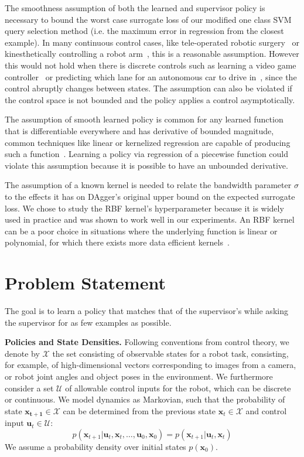 \documentclass[10pt, conference]{ieeeconf}      %
\newcommand{\bu}{\mathbf{u}}
\newcommand{\bx}{\mathbf{x}}
\begin{document}
The smoothness assumption of both the learned and supervisor policy is necessary to bound the worst case surrogate loss of our modified one class SVM query selection method (i.e. the maximum error in regression from the closest example). In many continuous control cases, like tele-operated robotic surgery~\cite{AnnualReport2014} or kinesthetically controlling a robot arm~\cite{akgun2012trajectories}, this is a reasonable assumption. However this would not hold when there is discrete controls such as learning a video game controller~\cite{NIPS2014_5421} or predicting which lane for an autonomous car to drive in~\cite{abbeel2004apprenticeship}, since the control abruptly changes between states.  The assumption can also be violated if the control space is not bounded and the policy applies a control asymptotically. 

The assumption of  smooth learned policy is common for any learned function that is differentiable everywhere and has derivative of bounded magnitude, common techniques like linear or kernelized regression are capable of producing such a function~\cite{scholkopf2002learning}. Learning a policy via regression of a piecewise function  could violate this assumption because it is possible to have an unbounded derivative. 

The assumption of a known kernel is needed to relate the bandwidth parameter $\sigma$ to the effects it has on DAgger's original upper bound on the expected surrogate loss. We chose to study the RBF kernel's hyperparameter because it is widely used in practice and was shown to work well in our experiments. An RBF kernel can be a poor choice in situations where the underlying function is linear or polynomial, for which there exists more data efficient kernels~\cite{scholkopf2002learning}. 


\section{Problem Statement}
The goal is to learn a policy that matches that of the supervisor's while asking the supervisor for as few examples as possible. 


\noindent\textbf{Policies and State Densities.}
Following conventions from control theory, we denote by $\mathcal{X}$ the set consisting of observable states for a robot task, consisting, for example, of 
high-dimensional vectors corresponding to images from a camera, or robot joint angles and object poses in the environment.
We furthermore consider a set $\mathcal{U}$ of allowable control inputs for the robot, which can be discrete or
continuous. We model dynamics as Markovian, such that the probability of state $\mathbf{x_{t+1}}\in
\mathcal{X}$ can be determined from the previous state $\mathbf{x}_t\in\mathcal{X}$ and control input $\mathbf{u}_t\in
\mathcal{U}$: 
$$p(\bx_{t+1}|\bu_{t},\bx_{t}, \ldots, \bu_{0}, \bx_{0})=p(\bx_{t+1}|\bu_{t}, \bx_t)$$
We assume a probability density over initial states $p(\bx_0)$.
\end{document}
